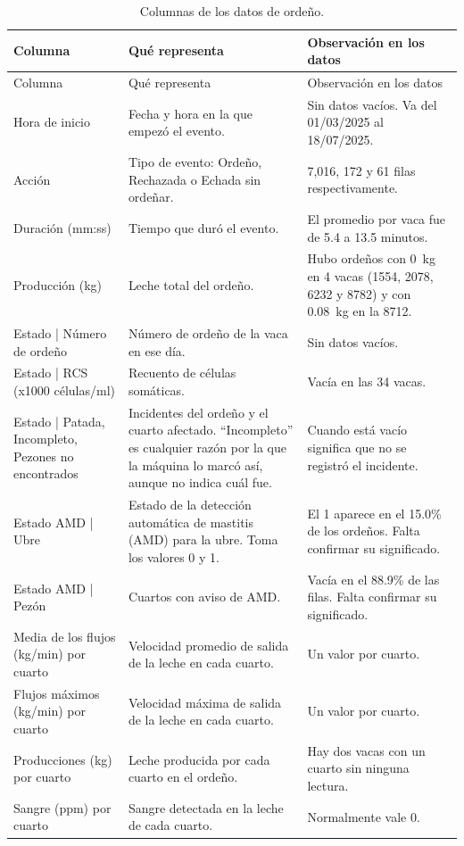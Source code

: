 \documentclass[11pt,letterpaper,DIV=12]{scrartcl}
\begin{document}
\begin{small}
\begin{longtable}{L{3.6cm}L{5.4cm}L{6cm}}
\caption{Columnas de los datos de ordeño.}\\
\toprule
Columna & Qué representa & Observación en los datos \\
\midrule
\endfirsthead
\toprule
Columna & Qué representa & Observación en los datos \\
\midrule
\endhead
\bottomrule
\endfoot
Hora de inicio & Fecha y hora en la que empezó el evento. & Sin datos vacíos. Va del 01/03/2025 al 18/07/2025. \\
Acción & Tipo de evento: Ordeño, Rechazada o Echada sin ordeñar. & 7,016, 172 y 61 filas respectivamente. \\
Duración (mm:ss) & Tiempo que duró el evento. & El promedio por vaca fue de 5.4 a 13.5 minutos. \\
Producción (kg) & Leche total del ordeño. & Hubo ordeños con 0~kg en 4 vacas (1554, 2078, 6232 y 8782) y con 0.08~kg en la 8712. \\
Estado | Número de ordeño & Número de ordeño de la vaca en ese día. & Sin datos vacíos. \\
Estado | RCS (x1000 células/ml) & Recuento de células somáticas. & Vacía en las 34 vacas. \\
Estado | Patada, Incompleto, Pezones no encontrados & Incidentes del ordeño y el cuarto afectado. ``Incompleto'' es cualquier razón por la que la máquina lo marcó así, aunque no indica cuál fue. & Cuando está vacío significa que no se registró el incidente. \\
Estado AMD | Ubre & Estado de la detección automática de mastitis (AMD) para la ubre. Toma los valores 0 y 1. & El 1 aparece en el 15.0\% de los ordeños. Falta confirmar su significado. \\
Estado AMD | Pezón & Cuartos con aviso de AMD. & Vacía en el 88.9\% de las filas. Falta confirmar su significado. \\
Media de los flujos (kg/min) por cuarto & Velocidad promedio de salida de la leche en cada cuarto. & Un valor por cuarto. \\
Flujos máximos (kg/min) por cuarto & Velocidad máxima de salida de la leche en cada cuarto. & Un valor por cuarto. \\
Producciones (kg) por cuarto & Leche producida por cada cuarto en el ordeño. & Hay dos vacas con un cuarto sin ninguna lectura. \\
Sangre (ppm) por cuarto & Sangre detectada en la leche de cada cuarto. & Normalmente vale 0. \\

\end{longtable}
\end{small}
\end{document}
